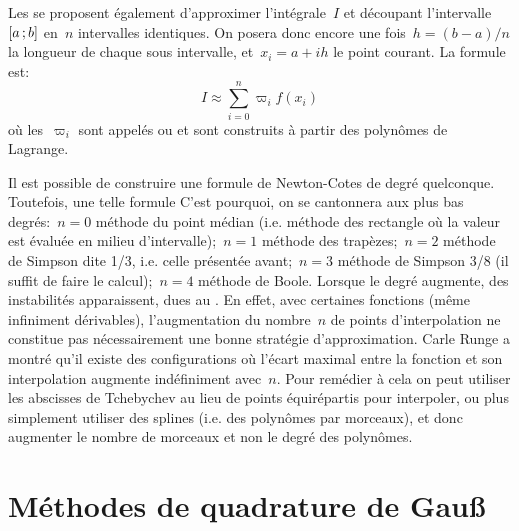 Les  se proposent également d'approximer l'intégrale~$I$ et découpant l'intervalle~$\mathopen{[}a\,;b\mathclose{]}$ en~$n$ intervalles identiques. On posera donc encore une fois~$h=(b-a)/n$ la longueur de chaque sous intervalle, et~$x_i=a+ih$ le point courant. La formule est: 
\begin{equation}
 I\approx \sum_{i=0}^n \varpi_i f(x_i) 
\end{equation}
où les~$\varpi_i$ sont appelés  ou  et sont construits à partir des polynômes de Lagrange.  

\begin{remarque} Il est possible de construire une formule de Newton-Cotes de degré quelconque. Toutefois, une telle formule  C'est pourquoi, on se cantonnera aux plus bas degrés:~$n=0$ méthode du point médian (i.e. méthode des rectangle où la valeur est évaluée en milieu d'intervalle);~$n=1$ méthode des trapèzes;~$n=2$ méthode de Simpson dite 1/3, i.e. celle présentée avant;~$n=3$ méthode de Simpson 3/8 (il suffit de faire le calcul);~$n=4$ méthode de Boole. Lorsque le degré augmente, des instabilités apparaissent, dues au . En effet, avec certaines fonctions (même infiniment dérivables), l'augmentation du nombre~$n$ de points d'interpolation ne constitue pas nécessairement une bonne stratégie d'approximation. Carle Runge a montré qu'il existe des configurations où l'écart maximal entre la fonction et son interpolation augmente indéfiniment avec~$n$. Pour remédier à cela on peut utiliser les abscisses de Tchebychev au lieu de points équirépartis pour interpoler, ou plus simplement utiliser des splines (i.e. des polynômes par morceaux), et donc augmenter le nombre de morceaux et non le degré des polynômes. 
\end{remarque} 

\medskip
\section{Méthodes de quadrature de Gauß} 


